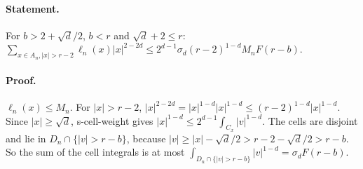 \paragraph{Statement.} For $b>2+\sqrt d/2$, $b<r$ and $\sqrt d+2\leq r$:
$\sum_{x\in A_n,|x|>r-2}\ell_n(x)|x|^{2-2d}\leq2^{d-1}\sigma_d(r-2)^{1-d}M_nF(r-b)$.
\paragraph{Proof.} $\ell_n(x)\leq M_n$. For $|x|>r-2$, $|x|^{2-2d}=|x|^{1-d}|x|^{1-d}\leq(r-2)^{1-d}|x|^{1-d}$. Since $|x|\geq\sqrt d$,
s-cell-weight gives $|x|^{1-d}\leq2^{d-1}\int_{C_x}|v|^{1-d}$. The cells are disjoint and lie in $D_n\cap\{|v|>r-b\}$, because
$|v|\geq|x|-\sqrt d/2>r-2-\sqrt d/2>r-b$. So the sum of the cell integrals is at most
$\int_{D_n\cap\{|v|>r-b\}}|v|^{1-d}=\sigma_dF(r-b)$.
